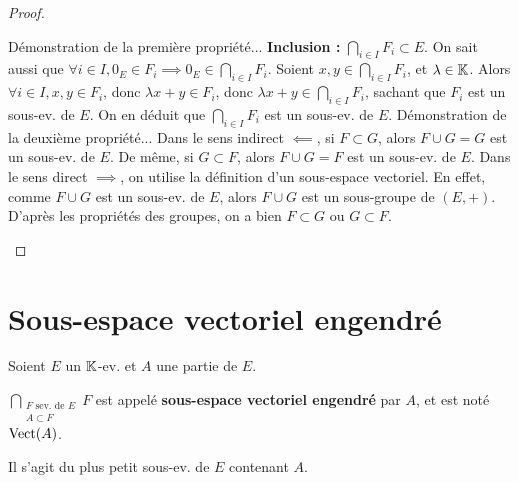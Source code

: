\documentclass[12pt, a4paper]{report}
\begin{document}
\begin{proof}
    \begin{outline}
        \1 Démonstration de la première propriété...
            \2 \textbf{Inclusion : } $\bigcap_{i \in I} F_i \subset E$.
            \2 On sait aussi que $\forall i \in I, 0_E \in F_i \implies 0_E \in \bigcap_{i\in I} F_i$.
            \2 Soient $x,y \in \bigcap_{i\in I} F_i$, et $\lambda \in \mathbb{K}$. Alors $\forall i \in I, x,y \in F_i$, donc $\lambda x + y \in F_i$, donc $\lambda x + y \in \bigcap_{i\in I} F_i$, sachant que $F_i$ est un sous-ev. de $E$.
            \2 On en déduit que $\bigcap_{i\in I} F_i$ est un sous-ev. de $E$.
        \1 Démonstration de la deuxième propriété...
            \2 Dans le sens indirect $\impliedby$, si $F \subset G$, alors $F \cup G = G$ est un sous-ev. de $E$. De même, si $G \subset F$, alors $F \cup G = F$ est un sous-ev. de $E$.
            \2 Dans le sens direct $\implies$, on utilise la définition d'un sous-espace vectoriel.
            \2 En effet, comme $F \cup G$ est un sous-ev. de $E$, alors $F \cup G$ est un sous-groupe de $(E,+)$.
            \2 D'après les propriétés des groupes, on a bien $F \subset G$ ou $G \subset F$.
    \end{outline}
\end{proof}

\section{Sous-espace vectoriel engendré}

\begin{definition}
    Soient $E$ un $\mathbb{K}$-ev. et $A$ une partie de $E$.

    $\bigcap_{\substack{F \text{ sev. de } E\\ A \subset F}} F$ est appelé \textbf{sous-espace vectoriel engendré} par $A$, et est noté $\mathrm{Vect}(A)$.
\end{definition}

\begin{property}
    Il s'agit du plus petit sous-ev. de $E$ contenant $A$.
\end{property}
\end{document}
